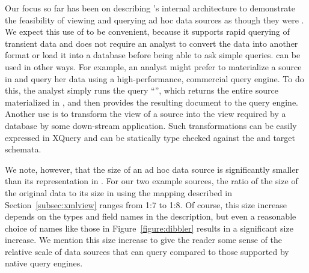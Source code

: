 Our focus so far has been on describing \padx{}'s internal
architecture to demonstrate the feasibility of viewing and querying ad
hoc data sources as though they were \Xml{}.  We expect this use of \padx{} to be convenient,
because it supports rapid querying of transient data and does not
require an analyst to convert the data into another format or load it
into a database before being able to ask simple queries.  \padx{} can
be used in other ways.  For example, an analyst might prefer
to materialize a \pads{} source in \Xml{} and query her data using a
high-performance, commercial \Xml{} query engine.  To do this, the
analyst simply runs the query ``'', which returns the
entire source materialized in \Xml{}, and then provides the resulting
\Xml{} document to the query engine.  Another use
is to transform the \padx{} view of a \pads{} source into the \Xml{}
view required by a database by some down-stream application.
Such transformations can be easily expressed in XQuery and can be
statically type checked against the \padx{} and target \Xml{}
schemata.

We note, however, that the size of an ad hoc data source is significantly
smaller than its representation in \Xml{}.  For our two example
\pads{} sources, the ratio of the size of the original \pads{} data to
its size in \Xml{} using the mapping described in
Section~\ref{subsec:xmlview} ranges from 1:7 to 1:8.  Of course, this
size increase depends on the \pads{} types and field names in the
\pads{} description, but even a reasonable choice of names like those
in Figure~\ref{figure:dibbler} results in a significant size increase.
We mention this size increase to give the reader some sense of the
relative scale of data sources that \padx{} can query compared to those
supported by native \Xml{} query engines.



